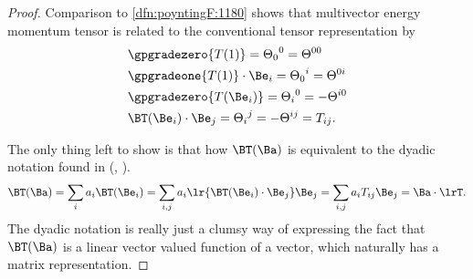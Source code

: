 \begin{proof}
Comparison to \cref{dfn:poyntingF:1180} shows that multivector energy momentum tensor is related to the conventional tensor representation by
\begin{equation}\label{eqn:poyntingF:820}
\begin{aligned}
&\gpgradezero{ T(1) }
=
{\Theta_0}^0 = \Theta^{00} \\
&\gpgradeone{ T(1) } \cdot \Be_i
= {\Theta_0}^i = \Theta^{0i} \\
&\gpgradezero{ T(\Be_i) }
= {\Theta_i}^0 = -\Theta^{i0} \\
&\BT(\Be_i) \cdot \Be_j = {\Theta_i}^j = -\Theta^{ij} = T_{ij}.
\end{aligned}
\end{equation}

The only thing left to show is that how \( \BT(\Ba) \) is equivalent to the dyadic notation found in
(\citep{griffiths1999introduction}, \citep{jackson1975cew}).
\begin{dmath}\label{eqn:poyntingF:1140}
\BT(\Ba)
=
\sum_i a_i \BT(\Be_i)
=
\sum_{i,j} a_i \lr{ \BT(\Be_i) \cdot \Be_j } \Be_j
=
\sum_{i,j} a_i T_{ij} \Be_j
=
\Ba \cdot \lrT.
\end{dmath}
The dyadic notation is really just a clumsy way of expressing the fact that \( \BT(\Ba) \) is a linear vector valued function of a vector, which naturally
has a matrix representation.
\end{proof}

